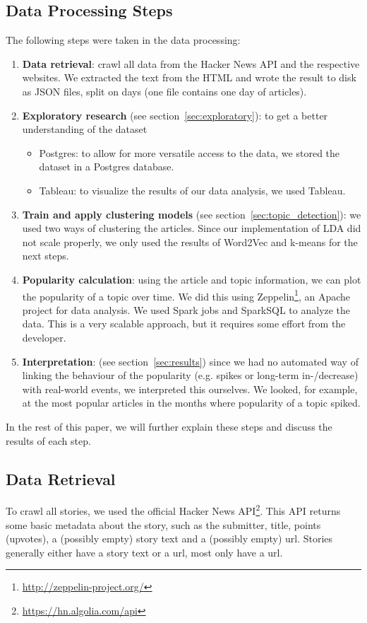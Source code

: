 \subsection{Data Processing Steps}
The following steps were taken in the data processing:
\begin{enumerate}
	\item \textbf{Data retrieval}: crawl all data from the Hacker News API and the respective websites. We extracted the text from the HTML and wrote the result to disk as JSON files, split on days (one file contains one day of articles).
	\item \textbf{Exploratory research} (see section~\ref{sec:exploratory}): to get a better understanding of the dataset
		\begin{itemize}
			\item Postgres: to allow for more versatile access to the data, we stored the dataset in a Postgres database.
			\item Tableau: to visualize the results of our data analysis, we used Tableau.
		\end{itemize}
	\item \textbf{Train and apply clustering models} (see section~\ref{sec:topic_detection}): we used two ways of clustering the articles. Since our implementation of LDA did not scale properly, we only used the results of Word2Vec and k-means for the next steps.
	\item \textbf{Popularity calculation}: using the article and topic information, we can plot the popularity of a topic over time. We did this using Zeppelin\footnote{\url{http://zeppelin-project.org/}}, an Apache project for data analysis. We used Spark jobs and SparkSQL to analyze the data. This is a very scalable approach, but it requires some effort from the developer.
	\item \textbf{Interpretation}: (see section~\ref{sec:results}) since we had no automated way of linking the behaviour of the popularity (e.g. spikes or long-term in-/decrease) with real-world events, we interpreted this ourselves. We looked, for example, at the most popular articles in the months where popularity of a topic spiked.
\end{enumerate}

In the rest of this paper, we will further explain these steps and discuss the results of each step.

\subsection{Data Retrieval}
To crawl all stories, we used the official Hacker News API\footnote{\url{https://hn.algolia.com/api}}. This API returns some basic metadata about the story, such as the submitter, title, points (upvotes), a (possibly empty) story text and a (possibly empty) url. Stories generally either have a story text or a url, most only have a url.

